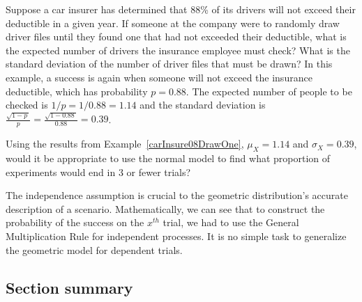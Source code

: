 \begin{examplewrap}
\begin{nexample}{Suppose a car insurer has determined
    that 88\% of its drivers will not exceed their deductible
    in a given year.
    If someone at the company were to randomly draw
    driver files until they found one that had not exceeded
    their deductible, what is the expected number of drivers
    the insurance employee must check?
    What is the standard deviation of the number of driver files
    that must be drawn?}
  \label{carInsure08DrawOne}%
  In this example, a success is again when someone will not
  exceed the insurance deductible, which has probability
  $p = 0.88$.
  The expected number of people to be checked is
  $1 / p = 1 / 0.88 = 1.14$ and the standard deviation is
  $\frac{\sqrt{1-p\ }}{p}=\frac{\sqrt{1-0.88\ }}{0.88} = 0.39$.
\end{nexample}
\end{examplewrap}

\begin{exercisewrap}
\begin{nexercise}
Using the results from Example~\ref{carInsure08DrawOne},
$\mu_{\scriptscriptstyle{X}} = 1.14$ and $\sigma_{\scriptscriptstyle{X}} = 0.39$, would it be appropriate
to use the normal model to find what proportion
of experiments would end in 3 or fewer trials?\footnotemark{}
\end{nexercise}
\end{exercisewrap}

The independence assumption is crucial to the geometric
distribution's accurate description of a scenario.
Mathematically, we can see that to construct the probability
of the success on the $x^{th}$ trial, we had to use the
General Multiplication Rule for independent processes.
It is no simple task to generalize the geometric model
for dependent trials.



\D{\newpage}

\subsection*{Section summary}

